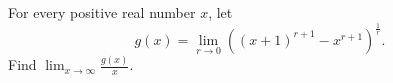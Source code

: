 For every positive real number $x$, let
\[
g(x) = \lim_{r \to 0} ((x+1)^{r+1} - x^{r+1})^{\frac{1}{r}}.
\]
Find $\lim_{x \to \infty} \frac{g(x)}{x}$.
